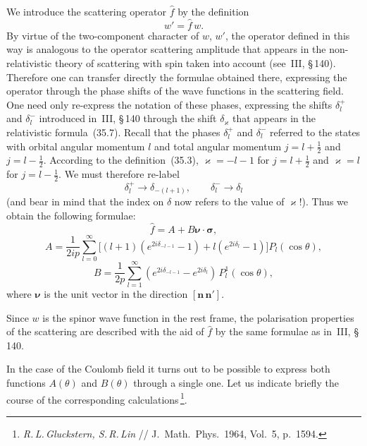 We introduce the scattering operator $\widehat f$ by the definition
\begin{equation}
w' = \widehat f\, w.
\tag{37.2}
\end{equation}
By virtue of the two-component character of $w$, $w'$, the operator defined in this way is analogous to the operator scattering amplitude that appears in the non-relativistic theory of scattering with spin taken into account (see~III, \S\,140). Therefore one can transfer directly the formulae obtained there, expressing the operator through the phase shifts of the wave functions in the scattering field. One need only re-express the notation of these phases, expressing the shifts $\delta_l^+$ and $\delta_l^-$ introduced in~III, \S\,140 through the shift $\delta_\varkappa$ that appears in the relativistic formula~(35.7). Recall that the phases $\delta_l^+$ and $\delta_l^-$ referred to the states with orbital angular momentum $l$ and total angular momentum $j = l + \tfrac{1}{2}$ and $j = l - \tfrac{1}{2}$. According to the definition~(35.3), $\varkappa = -l-1$ for $j = l + \tfrac{1}{2}$ and $\varkappa = l$ for $j = l - \tfrac{1}{2}$. We must therefore re-label
\[
\delta_l^+ \to \delta_{-(l+1)},\qquad \delta_l^- \to \delta_l
\]
(and bear in mind that the index on $\delta$ now refers to the value of $\varkappa$!). Thus we obtain the following formulae:
\begin{equation}
\widehat f = A + B\boldsymbol{\nu}\cdot\boldsymbol{\sigma},
\tag{37.3}
\end{equation}
\begin{equation}
A = \frac{1}{2ip}\sum_{l=0}^{\infty}\bigl[(l+1)(e^{2i\delta_{-l-1}} - 1) + l(e^{2i\delta_l} - 1)\bigr]P_l(\cos\theta),
\tag{37.4}
\end{equation}
\begin{equation}
B = \frac{1}{2p}\sum_{l=1}^{\infty}(e^{2i\delta_{-l-1}} - e^{2i\delta_l})\,P_l^1(\cos\theta),
\tag{37.5}
\end{equation}
where $\boldsymbol{\nu}$ is the unit vector in the direction $[\mathbf{n}\,\mathbf{n}']$.

Since $w$ is the spinor wave function in the rest frame, the polarisation properties of the scattering are described with the aid of $\widehat f$ by the same formulae as in~III, \S\,140.

In the case of the Coulomb field it turns out to be possible to express both functions $A(\theta)$ and $B(\theta)$ through a single one. Let us indicate briefly the course of the corresponding calculations\,\footnote{\textit{R.\,L.\,Gluckstern, S.\,R.\,Lin} // J.\ Math.\ Phys.\ 1964, Vol.~5, p.~1594.}.

